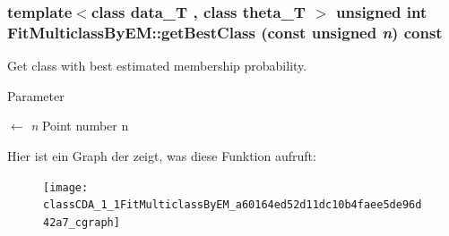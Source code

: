 \hypertarget{classCDA_1_1FitMulticlassByEM_a60164ed52d11dc10b4faee5de96d42a7}{
\subsubsection[{getBestClass}]{\setlength{\rightskip}{0pt plus 5cm}template$<$class data\_\-T , class theta\_\-T $>$ unsigned int FitMulticlassByEM::getBestClass (const unsigned {\em n}) const}}
\label{classCDA_1_1FitMulticlassByEM_a60164ed52d11dc10b4faee5de96d42a7}


Get class with best estimated membership probability. 


\begin{DoxyParams}{Parameter}
\item[\mbox{$\leftarrow$} {\em n}]Point number n \end{DoxyParams}


Hier ist ein Graph der zeigt, was diese Funktion aufruft:\nopagebreak
\begin{figure}[H]
\begin{center}
\leavevmode
\texttt{[image: classCDA\_1\_1FitMulticlassByEM\_a60164ed52d11dc10b4faee5de96d42a7\_cgraph]}
\end{center}
\end{figure}


